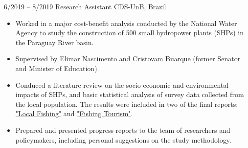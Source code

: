 \documentclass[9pt]{developercv} %
\begin{document}
\begin{entrylist}
{\begin{itemize}[noitemsep,topsep=0pt,parsep=0pt,partopsep=0pt, leftmargin=-1pt]
        \end{itemize}}
	\entry
		{6/2019 -- 8/2019}
		{Research Assistant}
		{CDS-UnB, Brazil}
		{\vspace{-10pt}
        \begin{itemize}[noitemsep,topsep=0pt,parsep=0pt,partopsep=0pt, leftmargin=-1pt]
            \item Worked in a major cost-benefit analysis conducted by the National Water Agency to study the construction of 500 small hydropower plants (SHPs) in the Paraguay River basin.
            \item Supervised by \href{http://lattes.cnpq.br/5290901839648752}{Elimar Nascimento} and Cristovam Buarque (former Senator and Minister of Education).
            \item Conduced a literature review on the socio-economic and environmental impacts of SHPs, and basic statistical analysis of survey data collected from the local population. The results were included in two of the final reports: \href{https://www.gov.br/ana/pt-br/assuntos/gestao-das-aguas/planos-e-estudos-sobre-rec-hidricos/plano-de-recursos-hidricos-rio-paraguai/relatorio-final_pesca-difusa.pdf}{"Local Fishing"} and  \href{https://www.gov.br/ana/pt-br/assuntos/gestao-das-aguas/planos-e-estudos-sobre-rec-hidricos/plano-de-recursos-hidricos-rio-paraguai/relatorio-final_turismo-de-pesca.pdf}{"Fishing Tourism"}. 
            \item Prepared and presented progress reports to the team of researchers and policymakers, including personal suggestions on the study methodology. 
        \end{itemize} 
        }
\end{entrylist}

\vspace{-10 pt}
    \vspace{-10pt}
    
    \hspace{26mm} 
\end{document}
